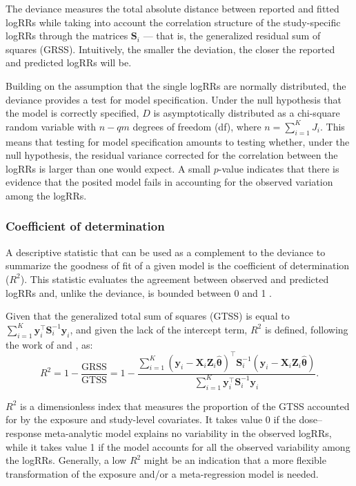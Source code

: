 The deviance measures the total absolute distance between reported and fitted logRRs  while taking into account the correlation structure of the study-specific logRRs through the matrices $\mathbf{S}_i$ --- that is, the generalized residual sum of squares (GRSS). Intuitively, the smaller the deviation, the closer the reported and predicted logRRs will be.

Building on the assumption that the single logRRs are normally distributed, the deviance provides a test for model specification. Under the null hypothesis that the model is correctly specified, $D$ is asymptotically distributed as a chi-square random variable  with $n-qm$ degrees of freedom (df), where $n = \sum_{i=1}^K J_i$. This means that testing for model specification amounts to testing whether, under the null hypothesis, the residual variance corrected for the correlation between the logRRs is larger than one would expect. A small $p$-value indicates that there is evidence that the posited model fails in accounting for the observed variation among the logRRs.

\subsubsection{Coefficient of determination}

A descriptive statistic that can be used as a complement to the deviance to summarize the goodness of fit of a given model is the coefficient of determination ($R^2$). This statistic evaluates the agreement between observed and predicted logRRs and, unlike the deviance, is bounded between 0 and 1 \citep{hagquist_goodness_1998, kvalseth_cautionary_1985}.

Given that the generalized total sum of squares (GTSS) is equal to $\sum_{i=1}^{K} \mathbf{y}_i^\top \mathbf{S}_i^{-1} \mathbf{y}_i$, and given the lack of the intercept term, $R^2$ is defined, following the work of \citet[section~6.2]{theil_economic_1961} and \citet{buse_goodness_1973}, as:
\begin{equation*}
R^2 = 1-\frac{\textrm{GRSS}}{\textrm{GTSS}} = 1 - \frac{\sum\limits_{i=1}^{K} \left(\mathbf{y}_i - \mathbf{X}_i \mathbf{Z}_i \hat{\boldsymbol{\theta}}\right)^\top \mathbf{S}_i^{-1} \left(\mathbf{y}_i - \mathbf{X}_i \mathbf{Z}_i \hat{\boldsymbol{\theta}}\right)}{\sum\limits_{i=1}^{K} \mathbf{y}_i^\top \mathbf{S}_i^{-1} \mathbf{y}_i}.
\end{equation*}

$R^2$ is a dimensionless index that measures the proportion of the GTSS accounted for by the exposure and study-level covariates. It takes value 0 if the dose--response meta-analytic model explains no variability in the observed logRRs, while it takes value 1 if the model accounts for all the observed variability among the logRRs. Generally, a low $R^2$ might be an indication that a more flexible transformation of the exposure and/or  a meta-regression model is needed.

